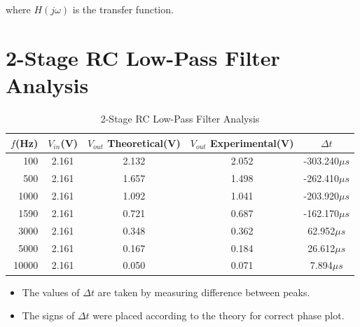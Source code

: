 \documentclass[12pt,a4paper]{report}
\begin{document}
where \( H(j\omega) \) is the transfer function.
\section*{2-Stage RC Low-Pass Filter Analysis}
\begin{table}[h]
    \centering
    \begin{tabular}{r c c c c}
        \toprule
        $f$(Hz) & $V_{in}$(V) & $V_{out}$ Theoretical(V) & $V_{out}$ Experimental(V) &  $\Delta t$\\
        \midrule
        100  & 2.161 & 2.132 & 2.052 & -303.240$\mu s$\\
        500  & 2.161 & 1.657 & 1.498 & -262.410$\mu s$\\
        1000 & 2.161 & 1.092 & 1.041 & -203.920$\mu s$\\
        1590 & 2.161 & 0.721 & 0.687 & -162.170$\mu s$\\
        3000 & 2.161 & 0.348 & 0.362 & 62.952$\mu s$\\
        5000 & 2.161 & 0.167 & 0.184 & 26.612$\mu s$\\
        10000 & 2.161 & 0.050 & 0.071 & 7.894$\mu s$\\
        \bottomrule
    \end{tabular}
    \caption{2-Stage RC Low-Pass Filter Analysis}
\end{table}
\begin{itemize}
    \item The values of $\Delta t$ are taken by measuring difference between peaks.
    \item The signs of $\Delta t$ were placed according to the theory for correct phase plot.
\end{itemize}
\end{document}
